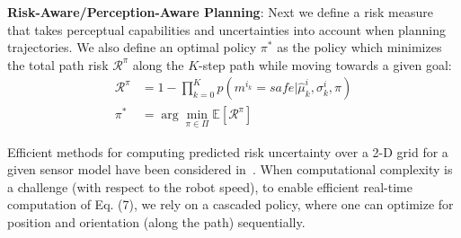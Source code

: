 \documentclass[letterpaper, 10pt, conference]{ieeeconf}      %
\newcommand{\ph}[1]{{\textbf{#1}:}} %
\newcommand{\rev}[1]{{\color{blue}#1}} %
\begin{document}
\ph{Risk-Aware/Perception-Aware Planning}
Next we define a risk measure that takes perceptual capabilities and uncertainties into account when planning trajectories.  We also define an optimal policy $\pi^*$ as the policy which minimizes the total path risk $\mathcal{R}^\pi$ along the $K$-step path while moving towards a given goal:
\begin{align}
 \mathcal{R}^{\pi} &= 1 - \prod_{k=0}^K p(m^{i_k}=safe | \hat{\mu}_k^{i},\sigma_k^{i},\pi)
 \label{eq:risk}\\
 \pi^* &= \arg\min_{\pi\in\Pi}\mathbb{E}[\mathcal{R}^{\pi}]
 \label{eq:policy}
\end{align}

Efficient methods for computing predicted risk uncertainty over a 2-D grid for a given sensor model have been considered in~\cite{heiden2017planning}.
When computational complexity is a challenge (with respect to the robot speed), to  enable  efficient  real-time  computation  of  Eq.  (7),  we  rely  on  a  cascaded  policy,  where one can optimize for position and orientation (along the path) sequentially.



\end{document}
